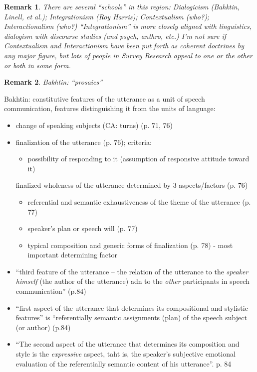 \documentclass[11pt,twoside]{article}
\newtheorem{remark}{Remark}
\newcommand{\SR}{Survey Research}
\begin{document}
\begin{remark}
  There are several ``schools'' in this region: Dialogicism (Bahktin,
  Linell, et al.); Integrationism (Roy Harris); Contextualism (who?);
  Interactionalism (who?)  ``Integrationism'' is more closely aligned
  with linguistics, dialogism with discourse studies (and psych,
  anthro, etc.)  I'm not sure if Contextualism and Interactionism have
  been put forth as coherent doctrines by any major figure, but lots
  of people in \SR{} appeal to one or the other or both in some form.
\end{remark}

\begin{abstract}

\end{abstract}

\begin{remark}
  Bakhtin: ``prosaics''
\end{remark}

Bakhtin: constitutive features of the utterance as a unit of speech
communication, features distinguishing it from the units of language:

\begin{itemize}
\item change of speaking subjects (CA: turns) (p. 71, 76)
\item finalization of the utterance (p. 76); criteria:
\begin{itemize}
\item possibility of responding to it (assumption of responsive attitude toward it)
\end{itemize}
finalized wholeness of the utterance determined by 3 aspects/factors (p. 76)
\begin{itemize}
\item referential and semantic exhaustiveness of the theme of the utterance (p. 77)
\item speaker's plan or speech will (p. 77)
\item typical composition and generic forms of finalization (p. 78) - most important determining factor
\end{itemize}
\item ``third feature of the utterance -- the relation of the
  utterance to the \textit{speaker himself} (the author of the
  utterance) adn to the \textit{other} participants in speech
  communication'' (p.84)
\item ``first aspect of the utterance that determines its
  compositional and stylistic features'' is ``referentially semantic
  assignments (plan) of the speech subject (or author) (p.84)
\item ``The second aspect of the utterance that determines its
  composition and style is the \textit{expressive} aspect, taht is,
  the speaker's subjective emotional evaluation of the referentially
  semantic content of his utterance''. p. 84
\end{itemize}
\end{document}
